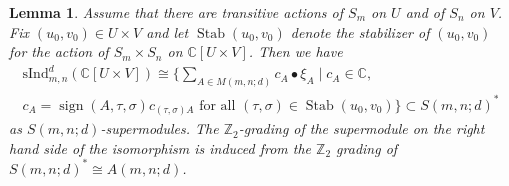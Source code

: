 \documentclass[12pt,reqno]{amsart}
\newtheorem{lemma}[theorem]{Lemma}
\theoremstyle{definition}
\theoremstyle{remark}
\newcommand{\ind}{\mathrm{sInd}_{m,n}^{d}}
\DeclareMathOperator{\Hom}{Hom}
\DeclareMathOperator{\sign}{sign}
\DeclareMathOperator{\stab}{Stab}
\begin{document}
\begin{lemma}\label{lemma:perm-induction}
    Assume that there are transitive actions of $S_{m}$ on $U$ and of $S_{n}$ on $V$.
    Fix $(u_{0},v_{0})\in U\times V$ and let $\stab(u_0, v_0)$ denote the stabilizer of $(u_0,v_0)$ for the action of $S_{m}\times S_n$ on $\mathbb{C}[U\times V]$.
    Then we have
    \begin{multline*}\ind (\mathbb{C}[U\times V])\cong \Big\{\sum_{A\in M(m,n;d)}c_{A}\bullet\xi_{A}\mid c_{A}\in \mathbb{C},\\ c_{A}=\sign(A,\tau,\sigma)c_{(\tau,\sigma)A}\text{ for all }(\tau,\sigma)\in \stab(u_{0},v_{0})\Big\}\subset S(m,n;d)^{*}\end{multline*} as $S(m,n;d)$-supermodules. The $\mathbb{Z}_2$-grading of the supermodule on the right hand side of the isomorphism is induced from the $\mathbb{Z}_2$ grading of $S(m,n;d)^{*}\cong A(m,n;d)$.
\end{lemma}

\end{document}
